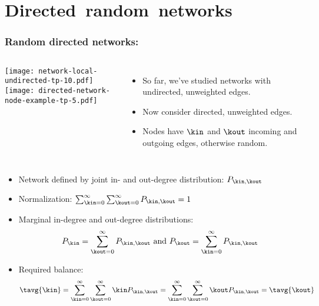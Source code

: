 \section{Directed\ random\ networks}

\begin{frame}
  \frametitle{Random directed networks:}

  \small
  \begin{columns}
    \texttt{[image: network-local-undirected-tp-10.pdf]}\\
    \texttt{[image: directed-network-node-example-tp-5.pdf]}
    \begin{itemize}
    \item<1->
      So far, we've studied networks with undirected, unweighted edges.
    \item<2->
      Now consider directed, unweighted edges.
  \item<3-> 
    Nodes have $\kin$ and $\kout$ incoming 
    and outgoing edges, otherwise random.
    \end{itemize}
  \end{columns}
  \begin{itemize}
  \item<4-> 
    Network defined by joint in- and out-degree distribution: $P_{\kin,\kout}$
  \item<5-> 
    Normalization: 
    $
    \sum_{\kin=0}^\infty
    \sum_{\kout=0}^\infty
    P_{\kin,\kout}
    = 
    1
    $
  \item<6-> 
    Marginal in-degree and out-degree distributions:
    $$
    P_{\kin} 
    = 
    \sum_{\kout=0}^\infty
    P_{\kin,\kout}
    \ \mbox{and} \
    P_{\kout} 
    = 
    \sum_{\kin=0}^\infty
    P_{\kin,\kout}
    $$
  \item<7-> 
    Required balance: 
    $$
    \tavg{\kin}
    =
    \sum_{\kin=0}^\infty
    \sum_{\kout=0}^\infty
    \kin
    P_{\kin,\kout}   
    = 
    \sum_{\kin=0}^\infty
    \sum_{\kout=0}^\infty
    \kout
    P_{\kin,\kout}
    =
    \tavg{\kout}
    $$
  \end{itemize}

\end{frame}

